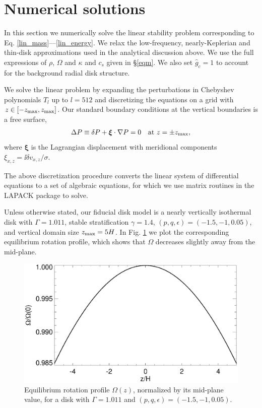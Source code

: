 \section{Numerical solutions}\label{numerical}
In this section we numerically solve the linear stability problem
corresponding to Eq. \ref{lin_mass}---\ref{lin_energy}. 
We relax the  low-frequency, nearly-Keplerian and thin-disk 
approximations used in the analytical discussion above. We 
use the full expressions of $\rho$, $\Omega$ and 
$\kappa$ and $c_s$ given in \S\ref{eqm}. We also set $\hat{g}_c=1$ to  
account for the background radial disk structure.  

We solve the linear problem by expanding the
perturbations in Chebyshev polynomials $T_l$ up to $l=512$
and discretizing the equations on a grid with
$z\in[-z_\mathrm{max},z_\mathrm{max}]$. Our standard boundary conditions at the vertical
boundaries is a free surface, 
\begin{align}
  \Delta P \equiv \delta P + \bm{\xi}\cdot\nabla P= 0 \quad \text{at } z=\pm z_\mathrm{max},
\end{align}
where $\bm{\xi}$ is the Lagrangian displacement with meridional 
components $\xi_{x,z} = \ii\delta v_{x,z}/\sigma$. 

The above discretization procedure
converts the linear system of differential equations to a set of 
algebraic equations, for which we use matrix routines in the LAPACK
package to solve. 

Unless otherwise stated, our fiducial disk model is a nearly 
vertically isothermal disk with $\Gamma=1.011$, stable
stratification $\gamma=1.4$, $(p,q,\epsilon)=(-1.5,-1,0.05)$, and 
vertical domain size $z_\mathrm{max}=5H$. In Fig. \ref{omega_z} we plot the
corresponding equilibrium rotation profile, which shows that $\Omega$
decreases slightly away from the mid-plane.  

\begin{figure}
  \includegraphics[width=\linewidth,clip=true,trim=0cm 0cm 0cm
  0cm]{figures/omega2} 
  \caption{Equilibrium rotation profile $\Omega(z)$,
    normalized by its mid-plane value, for a disk with $\Gamma=1.011$
    and $(p,q,\epsilon)=(-1.5,-1,0.05)$. 
    \label{omega_z} 
  }
\end{figure}

